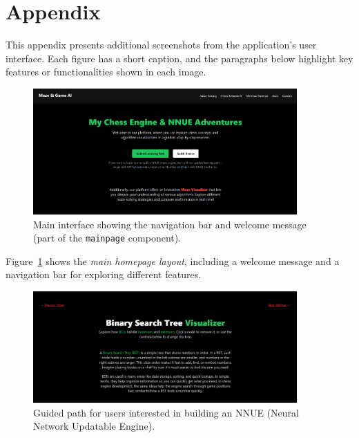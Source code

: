 \documentclass[12pt,a4paper]{article}
\begin{document}

 
\appendix
\section{Appendix}
\label{sec:appendix}

This appendix presents additional screenshots from the application’s user interface. 
Each figure has a short caption, and the paragraphs below highlight key features 
or functionalities shown in each image.

\begin{figure}[htbp]
  \centering
  \includegraphics[width=0.9\textwidth]{figures/Main.png}
  \caption{Main interface showing the navigation bar and welcome message (part of the \texttt{mainpage} component).}
  \label{fig:ui_main_screen}
\end{figure}

\noindent
Figure~\ref{fig:ui_main_screen} shows the \emph{main homepage layout}, 
including a welcome message and a navigation bar for exploring different features.

\FloatBarrier
\begin{figure}[htbp]
  \centering
  \includegraphics[width=0.9\textwidth]{figures/Bst.png}
  \caption{Guided path for users interested in building an NNUE (Neural Network Updatable Engine).}
  \label{fig:bst}
\end{figure}
\end{document}
